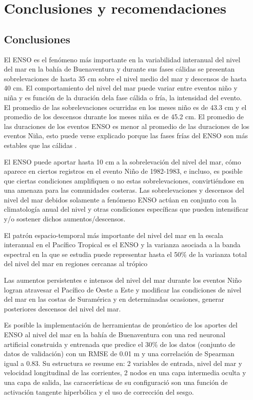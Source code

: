 \chapter{Conclusiones y recomendaciones}
\section{Conclusiones}

El ENSO es el fenómeno más importante en la variabilidad interanual del nivel del mar en la bahía de Buenaventura y durante sus fases cálidas se presentan sobrelevaciones de hasta 35 cm sobre el nivel medio del mar y descensos de hasta 40 cm. El comportamiento del nivel del mar puede variar entre eventos niño y niña y es función de la duración dela fase cálida o fría, la intensidad del evento. El promedio de las sobrelevaciones ocurridas en los meses niño es de 43.3 cm y el promedio de los descensos durante los meses niña es de 45.2 cm. El promedio de las duraciones de los eventos ENSO es menor al promedio de las duraciones de los eventos Niña, esto puede verse explicado porque las fases frías del ENSO son más estables que las cálidas \cite{Gouirand2003}.

El ENSO puede aportar hasta 10 cm a la sobrelevación del nivel del mar, cómo aparece en ciertos registros en el evento Niño de 1982-1983, e incluso, es posible que ciertas condiciones amplifiquen o no estas sobrelevaciones, convirtiéndose en una amenaza para las comunidades costeras. Las sobrelevaciones y descensos del nivel del mar debidos solamente a fenómeno ENSO actúan en conjunto con la climatología anual del nivel y otras condiciones específicas que pueden intensificar y/o sostener dichos aumentos/descensos.

El patrón espacio-temporal más importante del nivel del mar en la escala interanual en el Pacífico Tropical es el ENSO y la varianza asociada a la banda espectral en la que se estudia puede representar hasta el 50\% de la varianza total del nivel del mar en regiones cercanas al trópico

Las aumentos persistentes e intensos del nivel del mar durante los eventos Niño logran atravesar el Pacífico de Oeste a Este y modificar las condiciones de nivel del mar en las costas de Suramérica y en determinadas ocasiones, generar posteriores descensos del nivel del mar.

Es posible la implementación de herramientas de pronóstico de los aportes del ENSO al nivel del mar en la bahía de Buenaventura con una red neuronal artificial construida y entrenada que predice el 30\% de los datos (conjunto de datos de validación) con un RMSE de 0.01 m y una correlación de Spearman igual a 0.83. Su estructura se resume en: 2 variables de entrada, nivel del mar y velocidad longitudinal de las corrientes, 2 nodos en una capa intermedia oculta y una capa de salida, las caracerísticas de su configuració son una función de activación tangente hiperbólica y el uso de corrección del sesgo.


